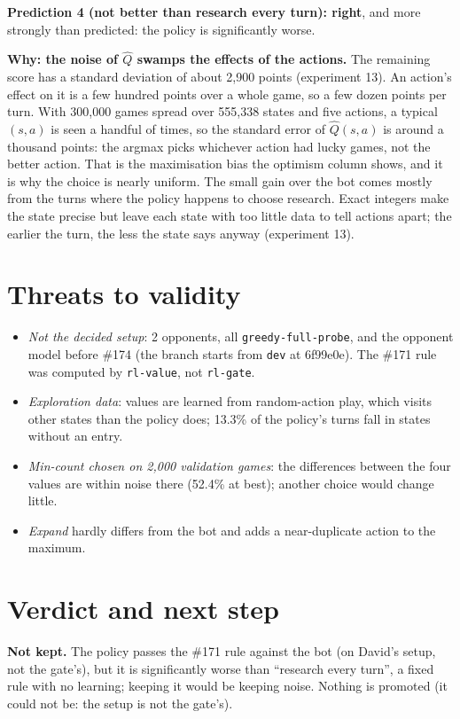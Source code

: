 \documentclass{../polyexp}
\begin{document}
\textbf{Prediction 4 (not better than research every turn): right}, and more strongly than predicted: the policy is
significantly worse.

\textbf{Why: the noise of $\hat Q$ swamps the effects of the actions.} The remaining score has a standard deviation
of about 2{,}900 points (experiment 13). An action's effect on it is a few hundred points over a whole game, so a
few dozen points per turn. With 300{,}000 games spread over 555{,}338 states and five actions, a typical
$(s,a)$ is seen a handful of times, so the standard error of $\hat Q(s,a)$ is around a thousand points: the
argmax picks whichever action had lucky games, not the better action. That is the maximisation bias the optimism
column shows, and it is why the choice is nearly uniform. The small gain over the bot comes mostly from the turns
where the policy happens to choose research. Exact integers make the state precise but leave each state with too
little data to tell actions apart; the earlier the turn, the less the state says anyway (experiment 13).


\section{Threats to validity}
\begin{itemize}
  \item \emph{Not the decided setup}: 2 opponents, all \texttt{greedy-full-probe}, and the opponent model before
        \#174 (the branch starts from \texttt{dev} at 6f99e0e). The \#171 rule was computed by \texttt{rl-value},
        not \texttt{rl-gate}.
  \item \emph{Exploration data}: values are learned from random-action play, which visits other states than the
        policy does; 13.3\% of the policy's turns fall in states without an entry.
  \item \emph{Min-count chosen on 2{,}000 validation games}: the differences between the four values are within
        noise there (52.4\% at best); another choice would change little.
  \item \emph{Expand} hardly differs from the bot and adds a near-duplicate action to the maximum.
\end{itemize}

\section{Verdict and next step}
\textbf{Not kept.} The policy passes the \#171 rule against the bot (on David's setup, not the gate's), but it is
significantly worse than ``research every turn'', a fixed rule with no learning; keeping it would be keeping noise.
Nothing is promoted (it could not be: the setup is not the gate's).
\end{document}
